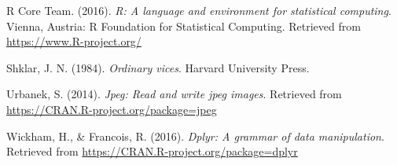 \documentclass[english,man]{apa6}
\theoremstyle{definition}
\theoremstyle{definition}
\theoremstyle{remark}
\begin{document}
\hypertarget{ref-R-base}{}
R Core Team. (2016). \emph{R: A language and environment for statistical
computing}. Vienna, Austria: R Foundation for Statistical Computing.
Retrieved from \url{https://www.R-project.org/}

\hypertarget{ref-shklar1984ordinary}{}
Shklar, J. N. (1984). \emph{Ordinary vices}. Harvard University Press.

\hypertarget{ref-R-jpeg}{}
Urbanek, S. (2014). \emph{Jpeg: Read and write jpeg images}. Retrieved
from \url{https://CRAN.R-project.org/package=jpeg}

\hypertarget{ref-R-dplyr}{}
Wickham, H., \& Francois, R. (2016). \emph{Dplyr: A grammar of data
manipulation}. Retrieved from
\url{https://CRAN.R-project.org/package=dplyr}
\end{document}
